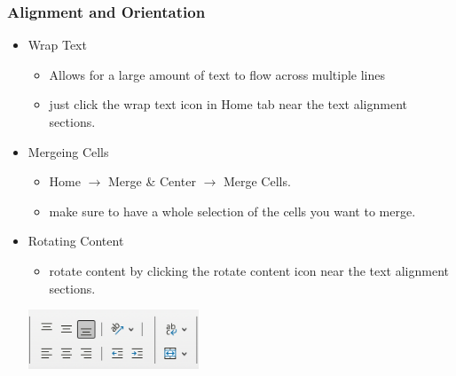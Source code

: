 \documentclass[12pt]{beamer}
\begin{document}
	\begin{frame}
		\frametitle{Alignment and Orientation}
	\begin{itemize}
		\item Wrap Text
			\begin{itemize}
				\item Allows for a large amount of text to flow across multiple lines
				\item just click the wrap text icon in Home tab near the text alignment sections.
			\end{itemize}
		\item Mergeing Cells
			\begin{itemize}
				\item Home $\rightarrow$ Merge \& Center $\rightarrow$ Merge Cells.
				\item make sure to have a whole selection of the cells you want to merge.
			\end{itemize}
		\item Rotating Content
			\begin{itemize}
				\item rotate content by clicking the rotate content icon near the text alignment sections.
			\end{itemize}
		\begin{center}
			\includegraphics[width=0.4\textwidth]{wraprotatetext.png}
		\end{center}
	\end{itemize}
	\end{frame}
\end{document}
